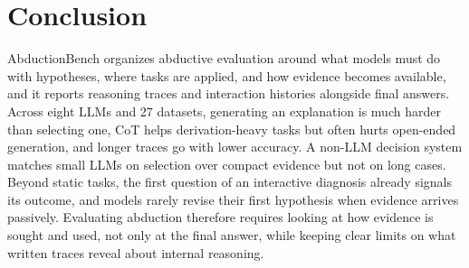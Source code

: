 \section{Conclusion}
\label{sec:conclusion}

AbductionBench organizes abductive evaluation around what models must do with hypotheses, where tasks are applied, and how evidence becomes available, and it reports reasoning traces and interaction histories alongside final answers. Across eight LLMs and 27 datasets, generating an explanation is much harder than selecting one, CoT helps derivation-heavy tasks but often hurts open-ended generation, and longer traces go with lower accuracy. A non-LLM decision system matches small LLMs on selection over compact evidence but not on long cases. Beyond static tasks, the first question of an interactive diagnosis already signals its outcome, and models rarely revise their first hypothesis when evidence arrives passively. Evaluating abduction therefore requires looking at how evidence is sought and used, not only at the final answer, while keeping clear limits on what written traces reveal about internal reasoning.
